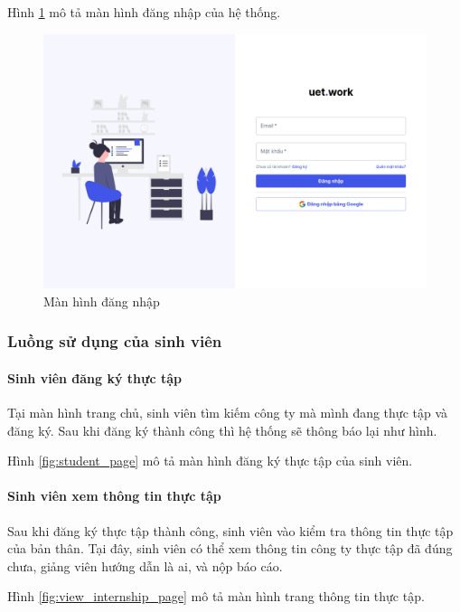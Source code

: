 \documentclass[./../main.tex]{subfiles}
\begin{document}
Hình \ref{fig:login_page} mô tả màn hình đăng nhập của hệ thống.

\begin{figure}[]
	\includegraphics[width=\linewidth]{./images/image5.png}
	\caption{Màn hình đăng nhập}
	\label{fig:login_page}
\end{figure}

\subsubsection{Luồng sử dụng của sinh viên}

\paragraph*{Sinh viên đăng ký thực tập}

Tại màn hình trang chủ, sinh viên tìm kiếm công ty mà mình đang thực tập và đăng ký. Sau khi đăng ký thành công thì hệ thống sẽ thông báo lại như hình.

Hình \ref{fig:student_page} mô tả màn hình đăng ký thực tập của sinh viên.

\paragraph*{Sinh viên xem thông tin thực tập}
Sau khi đăng ký thực tập thành công, sinh viên vào kiểm tra thông tin thực tập của bản thân. Tại đây, sinh viên có thể xem thông tin công ty thực tập đã đúng chưa,  giảng viên hướng dẫn là ai, và nộp báo cáo.

Hình \ref{fig:view_internship_page} mô tả màn hình trang thông tin thực tập.
\end{document}
